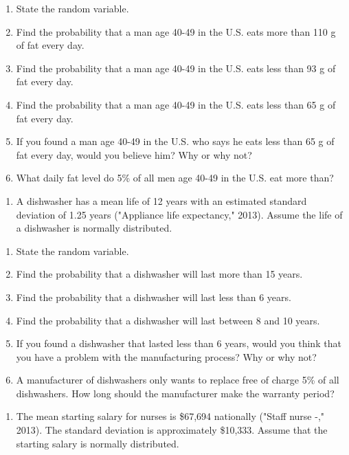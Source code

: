 \documentclass[
]{book}
\providecommand{\tightlist}{%
  \setlength{\itemsep}{0pt}\setlength{\parskip}{0pt}}
\begin{document}
\begin{enumerate}
\def\labelenumi{\alph{enumi}.}
\tightlist
\item
  State the random variable.
\item
  Find the probability that a man age 40-49 in the U.S. eats more than 110 g of fat every day.
\item
  Find the probability that a man age 40-49 in the U.S. eats less than 93 g of fat every day.
\item
  Find the probability that a man age 40-49 in the U.S. eats less than 65 g of fat every day.
\item
  If you found a man age 40-49 in the U.S. who says he eats less than 65 g of fat every day, would you believe him? Why or why not?
\item
  What daily fat level do 5\% of all men age 40-49 in the U.S. eat more than?
\end{enumerate}

\begin{enumerate}
\def\labelenumi{\arabic{enumi}.}
\setcounter{enumi}{7}
\tightlist
\item
  A dishwasher has a mean life of 12 years with an estimated standard deviation of 1.25 years ("Appliance life expectancy," 2013). Assume the life of a dishwasher is normally distributed.
\end{enumerate}

\begin{enumerate}
\def\labelenumi{\alph{enumi}.}
\tightlist
\item
  State the random variable.
\item
  Find the probability that a dishwasher will last more than 15 years.
\item
  Find the probability that a dishwasher will last less than 6 years.
\item
  Find the probability that a dishwasher will last between 8 and 10 years.
\item
  If you found a dishwasher that lasted less than 6 years, would you think that you have a problem with the manufacturing process? Why or why not?
\item
  A manufacturer of dishwashers only wants to replace free of charge 5\% of all dishwashers. How long should the manufacturer make the warranty period?
\end{enumerate}

\begin{enumerate}
\def\labelenumi{\arabic{enumi}.}
\setcounter{enumi}{8}
\tightlist
\item
  The mean starting salary for nurses is \$67,694 nationally ("Staff nurse -," 2013). The standard deviation is approximately \$10,333. Assume that the starting salary is normally distributed.
\end{enumerate}
\end{document}
